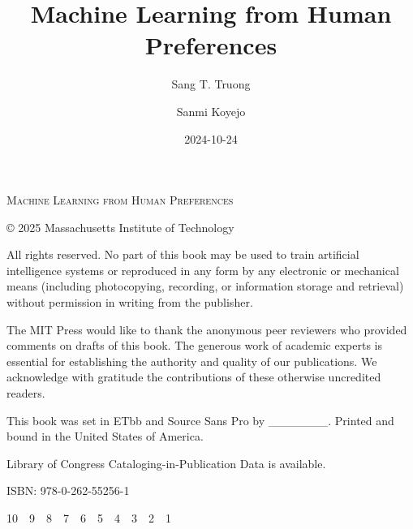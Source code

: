 \documentclass[
  letterpaper,
  numbers=noenddot,
  DIV=11,
  oneside]{scrreprt}
\title{Machine Learning from Human Preferences}
\author{Sang T. Truong \and Sanmi Koyejo}
\date{2024-10-24}
\theoremstyle{remark}
\begin{document}
\newgeometry{}

\begin{titlepage}
\end{titlepage}

\begin{titlepage}
  \centering
  {\scshape\Huge Machine Learning from Human
Preferences\par}\clearpage
\end{titlepage}


\begin{titlepage}
  \vspace*{\fill}
  {\rmfamily\scriptsize
    © 2025 Massachusetts Institute of Technology\par
    All rights reserved. No part of this book may be used to train artificial intelligence systems or reproduced in any form by any electronic or mechanical means (including photocopying, recording, or information storage and retrieval) without permission in writing from the publisher.\par
    The MIT Press would like to thank the anonymous peer reviewers who provided comments on drafts of this book. The generous work of academic experts is essential for establishing the authority and quality of our publications. We acknowledge with gratitude the contributions of these otherwise uncredited readers.\par
    This book was set in ETbb and Source Sans Pro by \_\_\_\_\_\_\_. Printed and bound in the United States of America.\par
    Library of Congress Cataloging-in-Publication Data is available.\par
    ISBN: 978-0-262-55256-1\par
    10 9 8 7 6 5 4 3 2 1\par
  }
  \vspace*{\fill}
\end{titlepage}
\end{document}

